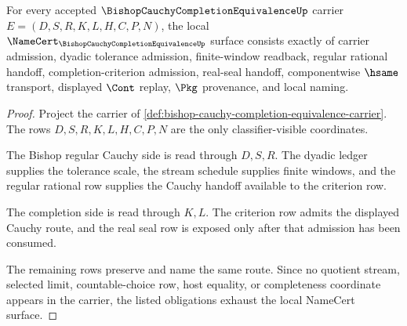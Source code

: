 \begin{theorem}
\label{thm:bishop-cauchy-completion-equivalence-namecert-obligations}
For every accepted $\BishopCauchyCompletionEquivalenceUp$ carrier $E=(D,S,R,K,L,H,C,P,N)$, the local $\NameCert_{\BishopCauchyCompletionEquivalenceUp}$ surface consists exactly of carrier admission, dyadic tolerance admission, finite-window readback, regular rational handoff, completion-criterion admission, real-seal handoff, componentwise $\hsame$ transport, displayed $\Cont$ replay, $\Pkg$ provenance, and local naming.
\end{theorem}
\begin{proof}
Project the carrier of \autoref{def:bishop-cauchy-completion-equivalence-carrier}. The rows $D,S,R,K,L,H,C,P,N$ are the only classifier-visible coordinates.

The Bishop regular Cauchy side is read through $D,S,R$. The dyadic ledger supplies the tolerance scale, the stream schedule supplies finite windows, and the regular rational row supplies the Cauchy handoff available to the criterion row.

The completion side is read through $K,L$. The criterion row admits the displayed Cauchy route, and the real seal row is exposed only after that admission has been consumed.

The remaining rows preserve and name the same route. Since no quotient stream, selected limit, countable-choice row, host equality, or completeness coordinate appears in the carrier, the listed obligations exhaust the local NameCert surface.
\end{proof}

